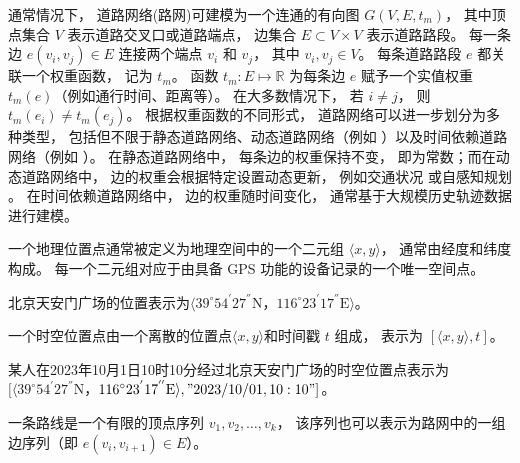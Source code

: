 \begin{definition}[道路网络]
    通常情况下， 道路网络(路网)可建模为一个连通的有向图 $G(V, E, t_m)$， 其中顶点集合 $V$ 表示道路交叉口或道路端点， 边集合 $E \subset V \times V$ 表示道路路段。 每一条边 $e(v_i, v_j) \in E$ 连接两个端点 $v_i$ 和 $v_j$， 其中 $v_i, v_j \in V$。 每条道路路段 $e$ 都关联一个权重函数， 记为 $t_m$。 函数 $t_m: E \mapsto \mathbb{R}$ 为每条边 $e$ 赋予一个实值权重 $t_m(e)$（例如通行时间、距离等）。 在大多数情况下， 若 $i \neq j$， 则 $t_m(e_i) \neq t_m(e_j)$。 根据权重函数的不同形式， 道路网络可以进一步划分为多种类型， 包括但不限于静态道路网络、动态道路网络（例如 ）以及时间依赖道路网络（例如 ）。 在静态道路网络中， 每条边的权重保持不变， 即为常数；而在动态道路网络中， 边的权重会根据特定设置动态更新， 例如交通状况  或自感知规划 。 在时间依赖道路网络中， 边的权重随时间变化， 通常基于大规模历史轨迹数据进行建模。
\end{definition}


\begin{definition}[地理位置点]
    一个地理位置点通常被定义为地理空间中的一个二元组 $\langle x, y \rangle$， 通常由经度和纬度构成。 每一个二元组对应于由具备 GPS 功能的设备记录的一个唯一空间点。
\end{definition}
\begin{example}[地理位置点示例]
    北京天安门广场的位置表示为$\langle39^{\circ}54^{'}27^{''}\mathrm{N}$，$116^{\circ}23^{'}17^{''}\mathrm{E}\rangle$。
\end{example}

\begin{definition}[时空位置点]
    一个时空位置点由一个离散的位置点$\langle x, y \rangle$和时间戳 $t$ 组成， 表示为 $[\langle x, y \rangle, t]$。
\end{definition}
\begin{example}[时空位置点示例]
    某人在2023年10月1日10时10分经过北京天安门广场的时空位置点表示为$[\langle39^{\circ}54^{'}27^{''}\mathrm{N}$，$116^{\circ}23^{'}17^{''}\mathrm{E}\rangle, "2023/10/01, 10:10"]$。
\end{example}


\begin{definition}[路线]
    一条路线是一个有限的顶点序列 $v_1,v_2,\ldots,v_k$， 该序列也可以表示为路网中的一组边序列（即 $e(v_i,v_{i+1})\in E$）。
\end{definition}





